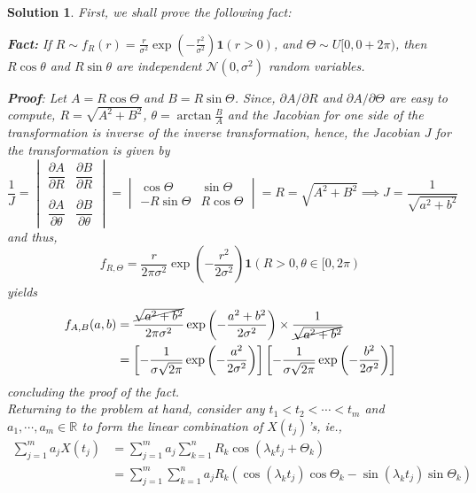 \documentclass[12pt]{article}
\theoremstyle{problemstyle}
\newtheorem*{solution*}{Solution}
\newcommand{\R}{\mathbb{R}}
\begin{document}
\begin{solution*}
    First, we shall prove the following fact:
    
    \textbf{Fact:} If $R\sim f_R(r) = \frac{r}{\sigma^2}\exp\left(-\frac{r^2}{\sigma^2}\right)\mathbf{1}(r>0)$, and $\Theta\sim U[0, 0+ 2\pi)$, then $R\cos\theta$ and $R\sin\theta$ are independent $\mathcal{N}(0,\sigma^2)$ random variables.
    
    \textbf{Proof}: Let $A = R\cos\Theta$ and $B= R\sin\Theta$. Since, $\partial{A}/{\partial R}$ and $\partial{A}/\partial \Theta$ are easy to compute, $R = \sqrt{A^2 + B^2}$, $\theta = \arctan \frac{B}{A}$ and the Jacobian for one side of the transformation is inverse of the inverse transformation, hence, the Jacobian $J$ for the transformation is given by $$\dfrac 1J = \begin{vmatrix} \dfrac{\partial A}{\partial R} & \dfrac{\partial B}{\partial R} \\ \\
    \dfrac{\partial A}{\partial \theta} & \dfrac{\partial B}{\partial \theta} 
    \end{vmatrix} = \begin{vmatrix} \cos\Theta & \sin\Theta \\ -R\sin\Theta & R\cos\Theta \end{vmatrix} = R = \sqrt{A^2 + B^2} \implies J = \dfrac{1}{\sqrt{a^2 + b^2}}
    $$
    and thus, 
    $$f_{R,\Theta} = \dfrac{r}{2\pi\sigma^2}\exp\left(-\frac{r^2}{2\sigma^2}\right)\mathbf{1}(R>0,\theta\in [0,2\pi)$$ yields
    \begin{align*}
        f_{A,B}(a,b) &= \dfrac{\cancel{\sqrt{a^2 + b^2}}}{2\pi\sigma^2}\exp\left(-\dfrac{a^2 + b^2}{2\sigma^2}\right)\times \dfrac{1}{\cancel{\sqrt{a^2 + b^2}}} \\ &= \left[-\dfrac{1}{\sigma\sqrt{2\pi}}\exp\left(-\dfrac{a^2}{2\sigma^2}\right)\right]\left[-\dfrac{1}{\sigma\sqrt{2\pi}}\exp\left(-\dfrac{b^2}{2\sigma^2}\right)\right]
    \end{align*}
    concluding the proof of the fact.
    \vspace{0.5cm}\\
    Returning to the problem at hand, consider any $t_1<t_2<\cdots<t_m$ and $a_1,\cdots,a_m\in \R$ to form the linear combination of $X(t_j)$'s, ie., 
    \begin{align*}
        \sum_{j=1}^m a_jX(t_j) & = \sum_{j = 1}^m a_j\sum_{k=1}^n R_k \cos(\lambda_kt_j + \Theta_k) \\
        &= \sum_{j=1}^m\sum_{k=1}^n a_jR_k(\cos(\lambda_kt_j)\cos\Theta_k -\sin(\lambda_kt_j)\sin\Theta_k)\\

\end{align*}
\end{solution*}
\end{document}
